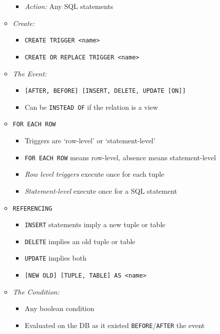 \documentclass[landscape,8pt]{extarticle}
\newcommand{\code}{\lstinline}
\begin{document}
\begin{multicols}{4}
\begin{itemize}
\begin{itemize}
\begin{itemize}
            \item \emph{Action:} Any SQL statements
        \end{itemize}
        \item \emph{Create:}
        \begin{itemize}
            \item \code{CREATE TRIGGER <name>}
            \item \code{CREATE OR REPLACE TRIGGER <name>}
        \end{itemize}
        \item \emph{The Event:}
        \begin{itemize}
            \item \code{[AFTER, BEFORE] [INSERT, DELETE, UPDATE [ON]]}
            \item Can be \code{INSTEAD OF} if the relation is a view
        \end{itemize}
        \item \code{FOR EACH ROW}
        \begin{itemize}
            \item Triggers are `row-level' or `statement-level'
            \item \code{FOR EACH ROW} means row-level, absence means statement-level
            \item \emph{Row level triggers} execute once for each tuple
            \item \emph{Statement-level} execute once for a SQL statement
        \end{itemize}
        \item \code{REFERENCING}
        \begin{itemize}
            \item \code{INSERT} statements imply a new tuple or table
            \item \code{DELETE} implies an old tuple or table
            \item \code{UPDATE} implies both
            \item \code{[NEW OLD] [TUPLE, TABLE] AS <name>}
        \end{itemize}
        \item \emph{The Condition:}
        \begin{itemize}
            \item Any boolean condition
            \item Evaluated on the DB as it existed \code{BEFORE}/\code{AFTER} the event
        \end{itemize}

\end{itemize}
\end{itemize}
\end{multicols}
\end{document}
